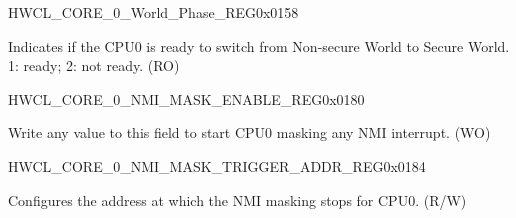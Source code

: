 \begin{register}{H}{WCL\_CORE\_0\_World\_Phase\_REG}{0x0158}\label{regdesc:WCLCORE0WORLDPHASEREG}
%
%
\regnewline%
\begin{regdesc}\begin{reglist}
\label{fielddesc:WCLCORE0WORLDPHASE}\item [WCL\_CORE\_0\_WORLD\_PHASE] Indicates if the CPU0 is ready to switch from Non-secure World to Secure World. 1: ready; 2: not ready. (RO)
\end{reglist}\end{regdesc}
\end{register}
















\begin{register}{H}{WCL\_CORE\_0\_NMI\_MASK\_ENABLE\_REG}{0x0180}\label{regdesc:WCLCORE0NMIMASKENABLEREG}
%
\regnewline%
\begin{regdesc}\begin{reglist}
\label{fielddesc:WCLCORE0NMIMASKENABLE}\item [WCL\_CORE\_0\_NMI\_MASK\_ENABLE] Write any value to this field to start CPU0 masking any NMI interrupt. (WO)
\end{reglist}\end{regdesc}
\end{register}


\begin{register}{H}{WCL\_CORE\_0\_NMI\_MASK\_TRIGGER\_ADDR\_REG}{0x0184}\label{regdesc:WCLCORE0NMIMASKTRIGGERADDRREG}
%
\regnewline%
\begin{regdesc}\begin{reglist}
\label{fielddesc:WCLCORE0NMIMASKTRIGGERADDR}\item [WCL\_CORE\_0\_NMI\_MASK\_TRIGGER\_ADDR] Configures the address at which the NMI masking stops for CPU0. (R/W)
\end{reglist}\end{regdesc}
\end{register}


